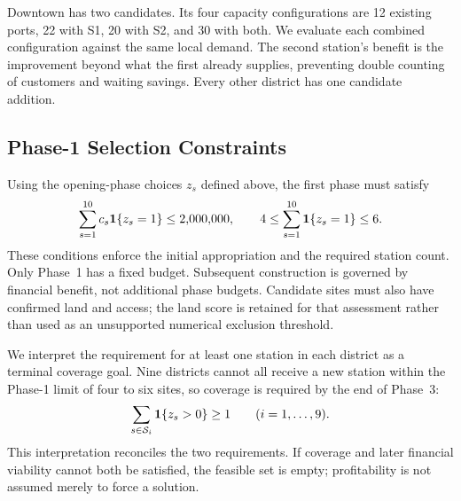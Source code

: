 \documentclass[12pt]{article}
\begin{document}
Downtown has two candidates. Its four capacity configurations are 12 existing ports,
22 with S1, 20 with S2, and 30 with both. We evaluate each combined configuration
against the same local demand. The second station's benefit is the improvement beyond
what the first already supplies, preventing double counting of customers and waiting
savings. Every other district has one candidate addition.

\subsection{Phase-1 Selection Constraints}
Using the opening-phase choices $z_s$ defined above, the first phase must satisfy
\begin{equation}
\sum_{s=1}^{10}c_s\mathbf 1\{z_s=1\}\le2{,}000{,}000,\qquad
4\le\sum_{s=1}^{10}\mathbf 1\{z_s=1\}\le6.
\label{eq:phaseone}
\end{equation}
These conditions enforce the initial appropriation and the required station count.
Only Phase~1 has a fixed budget. Subsequent construction is governed by financial
benefit, not additional phase budgets. Candidate sites must also have confirmed land
and access; the land score is retained for that assessment rather than used as an
unsupported numerical exclusion threshold.

We interpret the requirement for at least one station in each district as a terminal
coverage goal. Nine districts cannot all receive a new station within the Phase-1
limit of four to six sites, so coverage is required by the end of Phase~3:
\begin{equation}
\sum_{s\in\mathcal S_i}\mathbf 1\{z_s>0\}\ge1\qquad(i=1,\ldots,9).
\label{eq:coverage}
\end{equation}
This interpretation reconciles the two requirements. If coverage and later financial
viability cannot both be satisfied, the feasible set is empty; profitability is not
assumed merely to force a solution.
\end{document}
